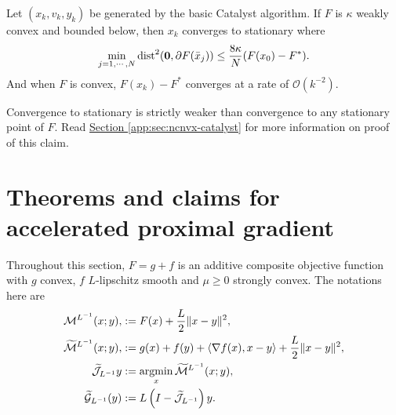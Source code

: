 \documentclass[12pt]{article}
\begin{document}
    \begin{theorem}\label{thm:basic-4wd-catalyst}
        Let $(x_k, v_k, y_k)$ be generated by the basic Catalyst algorithm. 
        If $F$ is $\kappa$ weakly convex and bounded below, then $x_k$ converges to stationary where
        \begin{align*}
            \min_{j = 1, \cdots, N} \operatorname{dist}^2(\mathbf 0, \partial F(\bar x_j))
            \le \frac{8 \kappa}{N}(F(x_0) - F^*). 
        \end{align*}
        And when $F$ is convex, $F(x_k) - F^*$ converges at a rate of $\mathcal O(k^{-2})$. 
    \end{theorem}
    \begin{remark}
        Convergence to stationary is strictly weaker than convergence to any stationary point of $F$. 
        Read 
        \hyperref[app:sec:ncnvx-catalyst]{Section \ref*{app:sec:ncnvx-catalyst}} for more information on proof of this claim. 
    \end{remark}





\newpage

\appendix
\section{Theorems and claims for accelerated proximal gradient}\label{app:sec:thm-claim-acc-prox-grad}
    Throughout this section, $F = g + f$ is an additive composite objective function with $g$ convex, $f$ $L$-lipschitz smooth and $\mu \ge0$ strongly convex. 
    The notations here are 
    \begin{align*}
        \mathcal M^{L^{-1}}(x; y),
        &:= 
        F(x) + \frac{L}{2}\Vert x - y\Vert^2,
        \\
        \widetilde{ \mathcal M}^{L^{-1}}(x; y) ,
        &:= g(x) + f(y) 
        + 
        \left\langle \nabla f(x), x - y\right\rangle 
        + 
        \frac{L}{2}\Vert x - y\Vert^2,
        \\
        \widetilde{\mathcal J}_{L^{-1}}y 
        &:= \mathop{\rm argmin}\limits_{x} \widetilde{\mathcal M}^{L^{-1}}(x; y),
        \\
        \widetilde{\mathcal G}_{L^{-1}}(y)
        &:= L\left(I - \widetilde{\mathcal J}_{L^{-1}}\right)y. 
    \end{align*}
\end{document}
